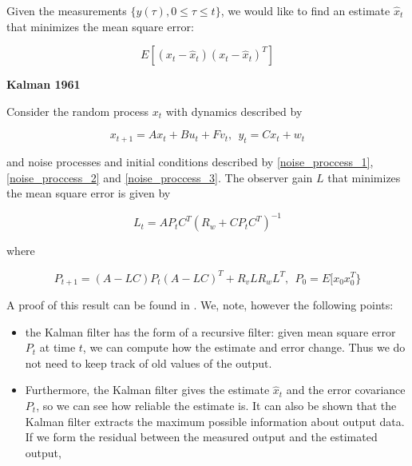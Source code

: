 Given the measurements $\{y(\tau), 0 \leq \tau \leq t \}$, we would like to find an estimate $\hat{x}_t$ that minimizes the mean square error:

\begin{equation}
E[(x_t - \hat{x}_t)(x_t - \hat{x}_t)^T] 
\end{equation}

\begin{framed}
\theoremstyle{theorem}
\begin{theorem}{\textbf{Kalman 1961}}


Consider the random process $x_t$ with dynamics described by  

\begin{equation}
x_{t+1} = Ax_t + Bu_t + Fv_t,  ~~ y_t = Cx_t + w_t \nonumber
\end{equation} 

and noise processes and initial conditions described by \ref{noise_proccess_1},  \ref{noise_proccess_2} and 
\ref{noise_proccess_3}. The observer gain $L$ that minimizes the mean square error is given by  

\begin{equation}
L_t = AP_tC^T(R_w + CP_tC^T)^{-1}  \nonumber
\end{equation}

where

\begin{equation}
P_{t+1} =  (A − LC)P_t(A − LC)^T + R_v LR_w L^T, ~~ P_0 = E[x_0x^{T}_0\}
\end{equation}

\end{theorem}
\end{framed}

A proof of this result can be found in \cite{Astrom}. We, note, however the following points:

\begin{itemize}
\item the Kalman filter has the form of a recursive filter: given mean square error $P_t$ at time $t$, we can compute how the estimate and error change. Thus we do not need to keep track of old values of the output.
\item Furthermore, the Kalman filter gives the estimate $\hat{x}_t$ and the error covariance $P_t$, so we can see how reliable the estimate is. 
It can also be shown that the Kalman filter extracts the maximum possible information about output data. 
If we form the residual between the measured output and the estimated output,
\end{itemize}


